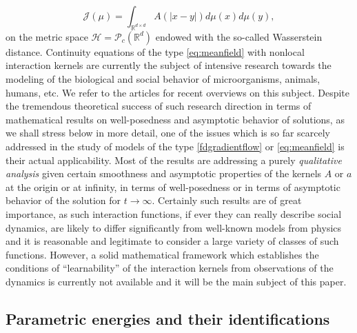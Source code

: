$$
\mathcal J (\mu) = \int_{\mathbb R^{d\times d}} A(| x-  y |) d \mu(x) d\mu(y),
$$
on the metric space $\mathcal H =\mathcal P_c(\mathbb R^d)$ endowed with the so-called Wasserstein distance. Continuity equations of the type \eqref{eq:meanfield} with nonlocal interaction kernels are currently the subject of intensive research  towards the modeling of the biological and social behavior of microorganisms, animals, humans, etc. We refer to the  articles \cite{13-Carrillo-Choi-Hauray-MFL,cafotove10} for recent overviews on this subject. Despite the tremendous theoretical success of such research direction in terms of mathematical results on well-posedness and asymptotic behavior of solutions, as we shall stress below in more detail, one of the issues which is so far scarcely addressed in the study of models of the type \eqref{fdgradientflow} or \eqref{eq:meanfield} is their actual applicability. Most of the results are addressing a purely {\it qualitative analysis} given certain smoothness and asymptotic properties of the kernels $A$ or $a$ at the origin or at infinity, in terms of well-posedness or in terms of asymptotic behavior of the solution for $t \to \infty$.  Certainly such results are of great importance, as such interaction functions, if ever they can really describe social dynamics,  are likely to differ significantly from well-known models from physics and it is reasonable and legitimate to consider a large variety of classes of such functions.
However, a solid mathematical framework which establishes the conditions of ``learnability'' of the interaction kernels from observations of the dynamics is currently not available and it will be the main subject of this paper.

\subsection{Parametric energies and their identifications}

